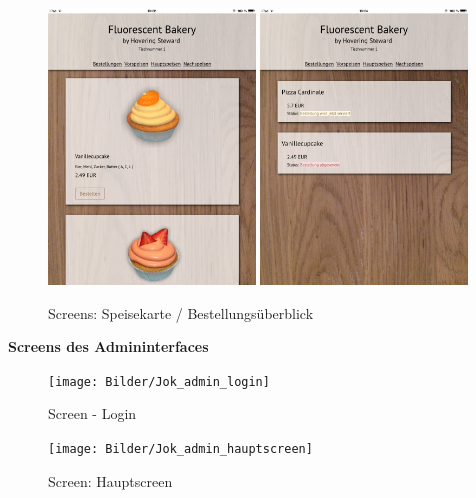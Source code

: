 			\begin{figure}[H]
			\begin{centering}
			\includegraphics[width = 0.49\textwidth]{Bilder/Jok_speisekarte}
			\includegraphics[width = 0.49\textwidth]{Bilder/Jok_status}
			\par\end{centering}
			\caption{Screens: Speisekarte / Bestellungsüberblick}
			\label{Screens: Speisekarte / Bestellungsüberblick}
			\end{figure}
\textbf{Screens des Admininterfaces}
			\begin{figure}[H]
			\begin{centering}
			\texttt{[image: Bilder/Jok\_admin\_login]}
			\par\end{centering}
			\caption{Screen - Login}
			\label{Screen - Login}
			\end{figure}
			\begin{figure}[H]
			\begin{centering}
			\texttt{[image: Bilder/Jok\_admin\_hauptscreen]}
			\par\end{centering}
			\caption{Screen: Hauptscreen}
			\label{Screen: Hauptscreen}
			\end{figure}
